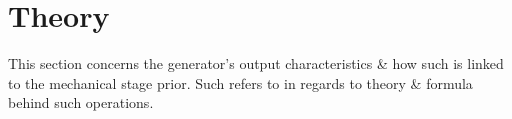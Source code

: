 \documentclass[conference]{ieeetran}
\begin{document}



\section{Theory}
This section concerns the generator's output characteristics \& how such is linked to the mechanical stage prior. Such refers to \cite{industrial2} in regards to theory \& formula behind such operations.

\end{document}
